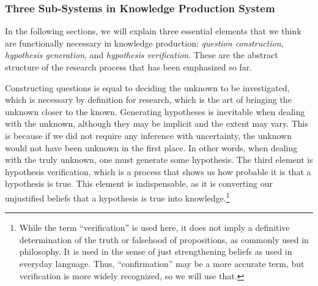 




\subsubsection{Three Sub-Systems in Knowledge Production System}
In the following sections, we will explain three essential elements that we think are functionally necessary in knowledge production: \textit{question construction}, \textit{hypothesis generation}, and \textit{hypothesis verification}. These are the abstract structure of the research process that has been emphasized so far.

Constructing questions is equal to deciding the unknown to be investigated, which is necessary by definition for research, which is the art of bringing the unknown closer to the known. Generating hypotheses is inevitable when dealing with the unknown, although they may be implicit and the extent may vary. This is because if we did not require any inference with uncertainty, the unknown would not have been unknown in the first place. In other words, when dealing with the truly unknown, one must generate some hypothesis. The third element is hypothesis verification, which is a process that shows us how probable it is that a hypothesis is true. This element is indispensable, as it is converting our unjustified beliefs that a hypothesis is true into knowledge.\footnote{
While the term ``verification'' is used here, it does not imply a definitive determination of the truth or falsehood of propositions, as commonly used in philosophy. It is used in the sense of just strengthening beliefs as used in everyday language. Thus, ``confirmation'' may be a more accurate term, but verification is more widely recognized, so we will use that.
}

